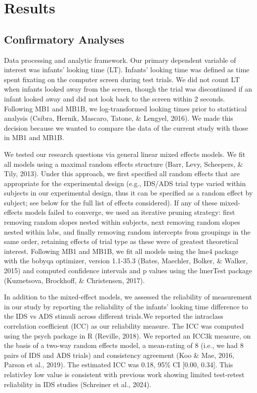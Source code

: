 \documentclass[
  ,man,floatsintext]{apa6}
\begin{document}
\hypertarget{results}{%
\section{Results}\label{results}}

\hypertarget{confirmatory-analyses}{%
\subsection{Confirmatory Analyses}\label{confirmatory-analyses}}

Data processing and analytic framework. Our primary dependent variable of interest was infants' looking time (LT). Infants' looking time was defined as time spent fixating on the computer screen during test trials. We did not count LT when infants looked away from the screen, though the trial was discontinued if an infant looked away and did not look back to the screen within 2 seconds. Following MB1 and MB1B, we log-transformed looking times prior to statistical analysis (Csibra, Hernik, Mascaro, Tatone, \& Lengyel, 2016). We made this decision because we wanted to compare the data of the current study with those in MB1 and MB1B.

We tested our research questions via general linear mixed effects models. We fit all models using a maximal random effects structure (Barr, Levy, Scheepers, \& Tily, 2013). Under this approach, we first specified all random effects that are appropriate for the experimental design (e.g., IDS/ADS trial type varied within subjects in our experimental design, thus it can be specified as a random effect by subject; see below for the full list of effects considered). If any of these mixed-effects models failed to converge, we used an iterative pruning strategy: first removing random slopes nested within subjects, next removing random slopes nested within labs, and finally removing random intercepts from groupings in the same order, retaining effects of trial type as these were of greatest theoretical interest. Following MB1 and MB1B, we fit all models using the lme4 package with the bobyqa optimizer, version 1.1-35.3 (Bates, Maechler, Bolker, \& Walker, 2015) and computed confidence intervals and p values using the lmerTest package (Kuznetsova, Brockhoff, \& Christensen, 2017).

In addition to the mixed-effect models, we assessed the reliability of measurement in our study by reporting the reliability of the infants' looking time difference to the IDS vs ADS stimuli across different trials.We reported the intraclass correlation coefficient (ICC) as our reliability measure. The ICC was computed using the psych package in R (Reville, 2018). We reported an ICC3k measure, on the basis of a two-way random effects model, a mean-rating of 8 (i.e., we had 8 pairs of IDS and ADS trials) and consistency agreement (Koo \& Mae, 2016, Parson et al., 2019). The estimated ICC was 0.18, 95\% CI {[}0.00, 0.34{]}. This relativley low value is consistent with previous work showing limited test-retest reliability in IDS studies (Schreiner et al., 2024).
\end{document}
